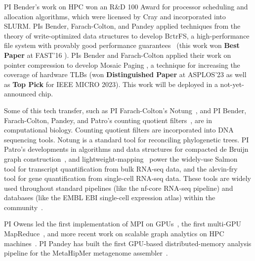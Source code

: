 PI Bender's work on HPC  won an R\&D 100 Award for processor scheduling and allocation algorithms, which were licensed
by Cray and incorporated into SLURM.
PIs Bender, Farach-Colton, and Pandey applied techniques from the theory of write-optimized data structures to develop B$\varepsilon$trFS, a high-performance file system with provably good performance guarantees~\cite{JannenYuZh15a,JannenYuZh15b,login2,YuanZhJa16,login1,DBLP:conf/fast/0001CJMGBFJJPY20,DBLP:conf/hotstorage/ConwayKJBJJPF19,DBLP:journals/tos/ZhanJPCKFBYJJ18,DBLP:conf/fast/ZhanCJKBFJJPY18,DBLP:journals/tos/YuanZJPACDKWBFJ17,DBLP:journals/usenix-login/ConwayBJ0BJJKPY17,DBLP:conf/fast/ConwayBJJZYBJKP17} (this work won \textbf{Best Paper} at FAST'16 \cite{YuanZhJa16}). 
PIs Bender and Farach-Colton  applied their work on pointer compression to develop Mosaic Paging \cite{mosaicasplos, mosaicspaa}, a technique for increasing the coverage of hardware TLBs (won \textbf{Distinguished Paper} at ASPLOS'23 as well as \textbf{Top Pick} for IEEE MICRO 2023). This work will be deployed  in a not-yet-announced chip. 

Some of this tech transfer, such as PI Farach-Colton's 
Notung~\cite{ChenDuFa00}, and 
PI  Bender, Farach-Colton, Pandey, and Patro's counting quotient filters~\cite{PandeyBeJo17}, are  in computational biology. 
Counting quotient filters are incorporated into 
DNA sequencing tools.
Notung is a standard tool for reconciling phylogenetic trees.
%
PI Patro's developments in algorithms and data structures for compacted de Bruijn graph construction~\cite{Khan2021,Khan2022}, and lightweight-mapping~\cite{Srivastava2016,Almodaresi2018Pufferfish,srivastava2020alignment,Almodaresi2021} power the widely-use Salmon~\cite{Patro2017Salmon} tool for transcript quantification from bulk RNA-seq data, and the alevin-fry~\cite{he2022alevin,He2023} tool for gene quantification from single-cell RNA-seq data.  These tools are widely used throughout standard pipelines (like the nf-core RNA-seq pipeline) and databases (like the EMBL EBI single-cell expression atlas) within the community~\cite{Ewels2020,George2023}.


PI Owens led the first implementation of MPI on GPUs~\cite{Stuart:2009:MPO:withouturl,Stuart:2011:EMT}, the first multi-GPU MapReduce~\cite{Stuart:2011:MMO}, and more recent work on scalable graph analytics on HPC machines~\cite{Pan:2018:SBS,Pan:2017:MGA,Chen:2022:SIP}. PI Pandey has built the first GPU-based distributed-memory \kmer analysis pipeline for the MetaHipMer metagenome assembler~\cite{nisa2021distributed}.

